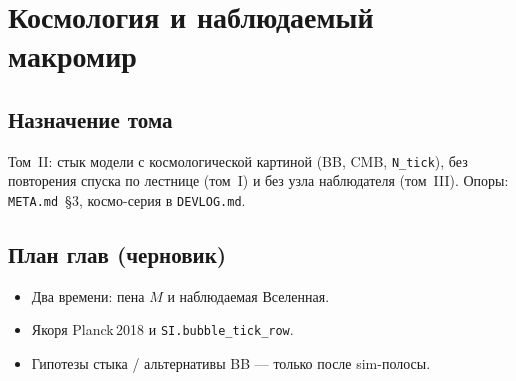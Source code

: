 \part{Космология и наблюдаемый макромир}

\chapter{Назначение тома}
Том~II: стык модели с космологической картиной (BB, CMB, \texttt{N\_tick}),
без повторения спуска по лестнице (том~I) и без узла наблюдателя (том~III).
Опоры: \texttt{META.md}~\S3, космо-серия в \texttt{DEVLOG.md}.

\chapter{План глав (черновик)}
\begin{itemize}
  \item Два времени: пена $M$ и наблюдаемая Вселенная.
  \item Якоря Planck\,2018 и \texttt{SI.bubble\_tick\_row}.
  \item Гипотезы стыка / альтернативы BB --- только после sim-полосы.
\end{itemize}
